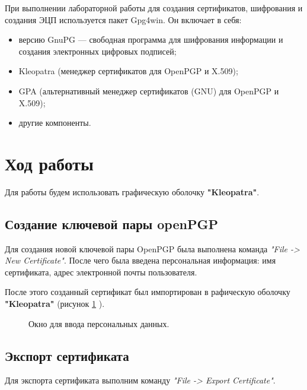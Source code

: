 \documentclass[10pt,a4paper]{report}
\begin{document}
При выполнении лабораторной работы для создания сертификатов, шифрования и создания ЭЦП используется пакет
Gpg4win. Он включает в себя:
\begin{itemize}
\item версию GnuPG — свободная программа для шифрования информации и создания электронных цифровых подписей;
\item Kleopatra (менеджер сертификатов для OpenPGP и X.509);
\item GPA (альтернативный менеджер сертификатов (GNU) для OpenPGP и X.509);
\item другие компоненты.
\end{itemize}
\pagebreak
\section{Ход работы}
Для работы будем использовать графическую оболочку \textbf{"Kleopatra"}.
\subsection{Создание ключевой пары openPGP}
Для создания новой ключевой пары OpenPGP была выполнена команда \textit{"File -> New Certificate"}. После чего была введена персональная информация: имя сертификата, адрес электронной почты пользователя.

После этого созданный сертификат был импортирован в рафическую оболочку \textbf{"Kleopatra"} (рисунок  \ref{ris:image1} ).

\begin{figure}[ht]	
\caption{Окно для ввода персональных данных.}\label{ris:image1}
\end{figure}

\subsection{Экспорт сертификата}
Для экспорта сертификата выполним команду \textit{"File ->  Export Certificate"}.
\end{document}
